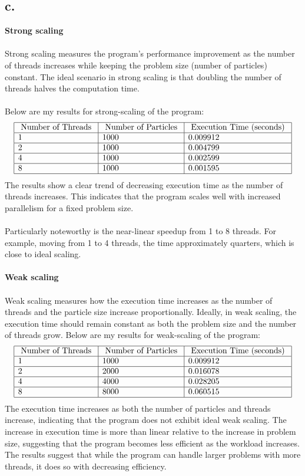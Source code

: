 \documentclass{article}
\begin{document}
\subsection*{c.}
\textbf{Strong scaling}
\\
\\
Strong scaling measures the program's performance improvement as the number of threads increases while keeping the problem size (number of particles) constant. The ideal scenario in strong scaling is that doubling the number of threads halves the computation time.
\\
\\
Below are my results for strong-scaling of the program:
$$
\begin{array}{|l|l|l|}
\hline \text { Number of Threads } & \text { Number of Particles } & \text { Execution Time (seconds) } \\
\hline 1 & 1000 & 0.009912 \\
\hline 2 & 1000 & 0.004799 \\
\hline 4 & 1000 & 0.002599 \\
\hline 8 & 1000 & 0.001595 \\
\hline
\end{array}
$$
The results show a clear trend of decreasing execution time as the number of threads increases. This indicates that the program scales well with increased parallelism for a fixed problem size.
\\
\\
Particularly noteworthy is the near-linear speedup from 1 to 8 threads. For example, moving from 1 to 4 threads, the time approximately quarters, which is close to ideal scaling.
\\
\\
\textbf{Weak scaling}
\\
\\
Weak scaling measures how the execution time increases as the number of threads and the particle size increase proportionally. Ideally, in weak scaling, the execution time should remain constant as both the problem size and the number of threads grow. Below are my results for weak-scaling of the program:
$$
\begin{array}{|l|l|l|}
\hline \text { Number of Threads } & \text { Number of Particles } & \text { Execution Time (seconds) } \\
\hline 1 & 1000 & 0.009912 \\
\hline 2 & 2000 & 0.016078 \\
\hline 4 & 4000 & 0.028205 \\
\hline 8 & 8000 & 0.060515 \\
\hline
\end{array}
$$
The execution time increases as both the number of particles and threads increase, indicating that the program does not exhibit ideal weak scaling.
The increase in execution time is more than linear relative to the increase in problem size, suggesting that the program becomes less efficient as the workload increases. The results suggest that while the program can handle larger problems with more threads, it does so with decreasing efficiency.
\end{document}
